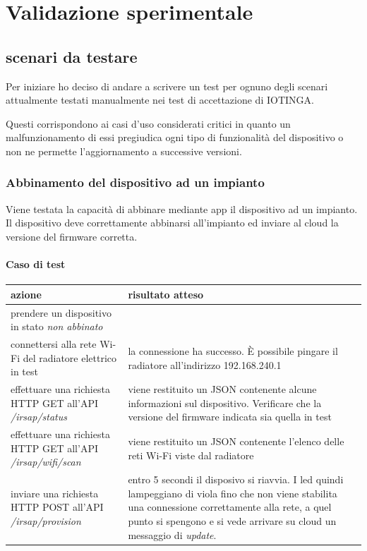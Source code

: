 \documentclass[12pt,a4paper,twoside,titlepage]{book}
\begin{document}
\chapter{Validazione sperimentale}

\section{scenari da testare}

Per iniziare ho deciso di andare a scrivere un test per ognuno degli scenari attualmente
testati manualmente nei test di accettazione di IOTINGA.

Questi corrispondono ai casi d'uso considerati critici in quanto un malfunzionamento
di essi pregiudica ogni tipo di funzionalità del dispositivo o non ne permette l'aggiornamento
a successive versioni.

\subsection{Abbinamento del dispositivo ad un impianto}

Viene testata la capacità di abbinare mediante app il dispositivo ad un impianto.
Il dispositivo deve correttamente abbinarsi all’impianto ed inviare al cloud la versione
del firmware corretta.

\subsubsection{Caso di test}
\begin{center}
\begin{tabular}{| p{} | p{} |}
    \hline \textbf{azione} & \textbf{risultato atteso} \\
    \hline prendere un dispositivo in stato \textit{non abbinato} & \\
    \hline connettersi alla rete Wi-Fi del radiatore elettrico in test & la connessione ha successo. È possibile pingare il radiatore all'indirizzo 192.168.240.1 \\
    \hline effettuare una richiesta HTTP GET all'API \textit{/irsap/status} & viene restituito un JSON contenente alcune informazioni sul dispositivo. Verificare che la versione del firmware indicata sia quella in test \\
    \hline effettuare una richiesta HTTP GET all'API \textit{/irsap/wifi/scan} & viene restituito un JSON contenente l'elenco delle reti Wi-Fi viste dal radiatore \\
    \hline inviare una richiesta HTTP POST all'API \textit{/irsap/provision} & entro 5 secondi il disposivo si riavvia. I led quindi lampeggiano di viola fino che non viene stabilita una connessione correttamente alla rete, a quel punto si spengono e si vede arrivare su cloud un messaggio di \textit{update}. \\
    \hline
\end{tabular}
\end{center}
\end{document}

